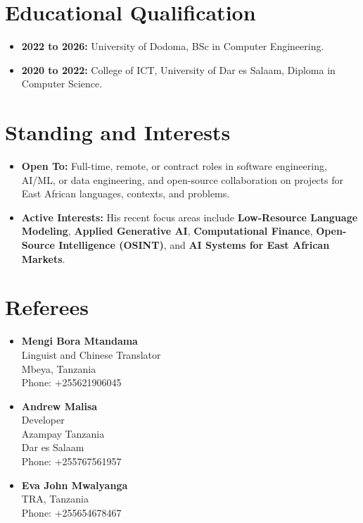 \documentclass[12pt]{article}
\begin{document}
\section*{Educational Qualification}
\begin{itemize}
    \item \textbf{2022 to 2026:} University of Dodoma, BSc in Computer Engineering.
    \item \textbf{2020 to 2022:} College of ICT, University of Dar es Salaam, Diploma in Computer Science.
\end{itemize}

\section*{Standing and Interests}
\begin{itemize}
    \item \textbf{Open To:} Full-time, remote, or contract roles in software engineering, AI/ML, or data engineering, and open-source collaboration on projects for East African languages, contexts, and problems.
    \item \textbf{Active Interests:} His recent focus areas include \textbf{Low-Resource Language Modeling}, \textbf{Applied Generative AI}, \textbf{Computational Finance}, \textbf{Open-Source Intelligence (OSINT)}, and \textbf{AI Systems for East African Markets}.
\end{itemize}

\section*{Referees}
\begin{itemize}
    \item \textbf{Mengi Bora Mtandama} \\
    Linguist and Chinese Translator \\
    Mbeya, Tanzania \\
    Phone: +255621906045

    \item \textbf{Andrew Malisa} \\
    Developer \\
    Azampay Tanzania \\
    Dar es Salaam \\
    Phone: +255767561957

    \item \textbf{Eva John Mwalyanga} \\
    TRA, Tanzania \\
    Phone: +255654678467
\end{itemize}
\end{document}
